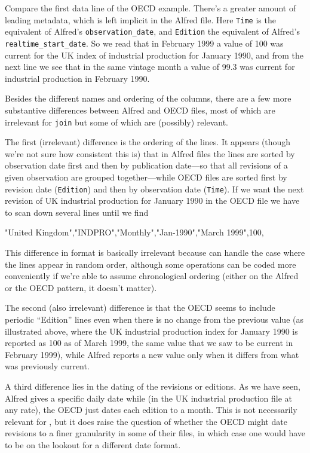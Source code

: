 Compare the first data line of the OECD example. There's a greater
amount of leading metadata, which is left implicit in the Alfred
file. Here \texttt{Time} is the equivalent of Alfred's
\verb|observation_date|, and \texttt{Edition} the equivalent of
Alfred's \verb|realtime_start_date|. So we read that in February 1999
a value of 100 was current for the UK index of industrial production
for January 1990, and from the next line we see that in the same
vintage month a value of 99.3 was current for industrial production in
February 1990.

Besides the different names and ordering of the columns, there are a
few more substantive differences between Alfred and OECD files, most
of which are irrelevant for \texttt{join} but some of which are
(possibly) relevant.

The first (irrelevant) difference is the ordering of the lines. It
appears (though we're not sure how consistent this is) that in Alfred
files the lines are sorted by observation date first and then by
publication date---so that all revisions of a given observation are
grouped together---while OECD files are sorted first by revision date
(\texttt{Edition}) and then by observation date (\texttt{Time}). If we
want the next revision of UK industrial production for January 1990 in
the OECD file we have to scan down several lines until we find
\begin{code}
"United Kingdom","INDPRO","Monthly","Jan-1990","March 1999",100,
\end{code}
This difference in format is basically irrelevant because 
can handle the case where the lines appear in random order, although
some operations can be coded more conveniently if we're able to assume
chronological ordering (either on the Alfred or the OECD pattern, it
doesn't matter).

The second (also irrelevant) difference is that the OECD seems to
include periodic ``Edition'' lines even when there is no change from
the previous value (as illustrated above, where the UK industrial
production index for January 1990 is reported as 100 as of March
1999, the same value that we saw to be current in February 1999),
while Alfred reports a new value only when it differs from what was
previously current.

A third difference lies in the dating of the revisions or editions.
As we have seen, Alfred gives a specific daily date while (in the UK
industrial production file at any rate), the OECD just dates each
edition to a month. This is not necessarily relevant for
, but it does raise the question of whether the OECD
might date revisions to a finer granularity in some of their files, in
which case one would have to be on the lookout for a different date
format.

